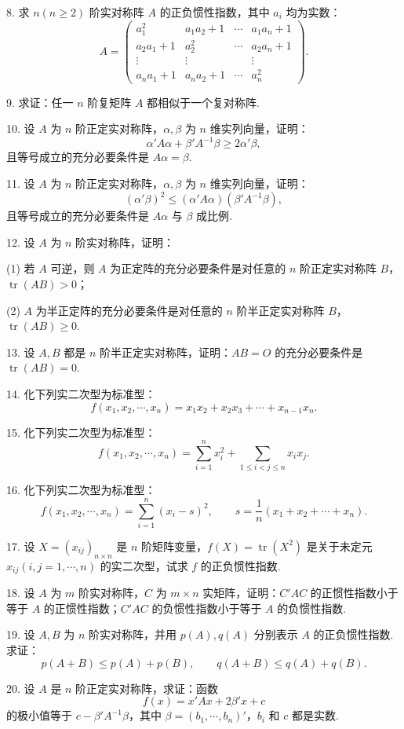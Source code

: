 \documentclass[UTF8, 12pt, fontset=fandol, oneside]{ctexart}
\begin{document}
8. 求 $n(n\geq 2)$ 阶实对称阵 $A$ 的正负惯性指数，其中 $a_i$ 均为实数：
\[
A=\left(\begin{array}{cccc}
a_1^2&a_1a_2+1&\cdots&a_1a_n+1\\
a_2a_1+1&a_2^2&\cdots&a_2a_n+1\\
\vdots&\vdots&&\vdots\\
a_na_1+1&a_na_2+1&\cdots&a_n^2
\end{array}\right).
\]

9. 求证：任一 $n$ 阶复矩阵 $A$ 都相似于一个复对称阵.

10. 设 $A$ 为 $n$ 阶正定实对称阵，$\alpha,\beta$ 为 $n$ 维实列向量，证明：
\[
\alpha'A\alpha+\beta'A^{-1}\beta\geq 2\alpha'\beta,
\]
且等号成立的充分必要条件是 $A\alpha=\beta$.

11. 设 $A$ 为 $n$ 阶正定实对称阵，$\alpha,\beta$ 为 $n$ 维实列向量，证明：
\[
(\alpha'\beta)^2\leq(\alpha'A\alpha)(\beta'A^{-1}\beta),
\]
且等号成立的充分必要条件是 $A\alpha$ 与 $\beta$ 成比例.

12. 设 $A$ 为 $n$ 阶实对称阵，证明：

(1) 若 $A$ 可逆，则 $A$ 为正定阵的充分必要条件是对任意的 $n$ 阶正定实对称阵 $B$，$\operatorname{tr}(AB)>0$；

(2) $A$ 为半正定阵的充分必要条件是对任意的 $n$ 阶半正定实对称阵 $B$，$\operatorname{tr}(AB)\geq 0$.

13. 设 $A,B$ 都是 $n$ 阶半正定实对称阵，证明：$AB=O$ 的充分必要条件是 $\operatorname{tr}(AB)=0$.

14. 化下列实二次型为标准型：
\[
f(x_1,x_2,\cdots,x_n)=x_1x_2+x_2x_3+\cdots+x_{n-1}x_n.
\]

15. 化下列实二次型为标准型：
\[
f(x_1,x_2,\cdots,x_n)=\sum_{i=1}^n x_i^2+\sum_{1\leq i<j\leq n}x_ix_j.
\]

16. 化下列实二次型为标准型：
\[
f(x_1,x_2,\cdots,x_n)=\sum_{i=1}^n(x_i-s)^2,\qquad s=\frac1n(x_1+x_2+\cdots+x_n).
\]

17. 设 $X=(x_{ij})_{n\times n}$ 是 $n$ 阶矩阵变量，$f(X)=\operatorname{tr}(X^2)$ 是关于未定元 $x_{ij}(i,j=1,\cdots,n)$ 的实二次型，试求 $f$ 的正负惯性指数.

18. 设 $A$ 为 $m$ 阶实对称阵，$C$ 为 $m\times n$ 实矩阵，证明：$C'AC$ 的正惯性指数小于等于 $A$ 的正惯性指数；$C'AC$ 的负惯性指数小于等于 $A$ 的负惯性指数.

19. 设 $A,B$ 为 $n$ 阶实对称阵，并用 $p(A),q(A)$ 分别表示 $A$ 的正负惯性指数. 求证：
\[
p(A+B)\leq p(A)+p(B),\qquad q(A+B)\leq q(A)+q(B).
\]

20. 设 $A$ 是 $n$ 阶正定实对称阵，求证：函数
\[
f(x)=x'Ax+2\beta'x+c
\]
的极小值等于 $c-\beta'A^{-1}\beta$，其中 $\beta=(b_1,\cdots,b_n)'$，$b_i$ 和 $c$ 都是实数.
\end{document}
